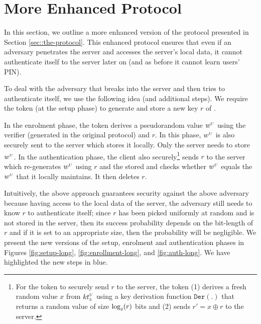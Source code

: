 

\section{More Enhanced Protocol}\label{sec::more-enhanced}



In this section, we outline a more enhanced version of the protocol presented in Section \ref{sec::the-protocol}. This enhanced protocol ensures that even if an adversary penetrates the server and accesses the server's local data, it cannot authenticate itself to the server later on (and as before it cannot learn users' PIN). 

To deal with the adversary that breaks into the server and then tries to authenticate itself, we use the following idea (and additional steps). We require the token (at the setup phase) to generate and store a new key $r$ of \prf.  

In the enrolment phase, the token derives a pseudorandom value $w^{\scriptscriptstyle U}$ using the verifier \VC{\verifier} (generated in the original protocol) and $r$. In this phase, $w^{\scriptscriptstyle U}$ is also securely sent to the server which stores it locally. Only the server needs to store $w^{\scriptscriptstyle U}$. 
%
In the authentication phase, the client also securely\footnote{For the token to securely send $r$ to the server, the token (1) derives a fresh random value $x$ from ${kt}_{\scriptscriptstyle 3}^{\scriptscriptstyle U}$ using a key derivation function $\mathtt{Der}(.)$ that returns a random value of size $\log_{\scriptscriptstyle 2}(r)$ bits and  (2) sends $r'=x\oplus r$ to the server.} sends $r$ to the server which re-generates  $w^{\scriptscriptstyle U}$ using $r$ and the stored \VC{\verifier} and checks whether $w^{\scriptscriptstyle U}$ equals the $w^{\scriptscriptstyle U}$ that it locally maintains. It then deletes $r$. 

Intuitively, the above approach guarantees security against the above adversary because having access to the local data of the server, the adversary still needs to know $r$ to authenticate itself; since $r$ has been picked uniformly at random and is not stored in the server, then its success probability depends on the bit-length of $r$ and if it is set to an appropriate size, then the probability will be negligible. 
%
%
We present the new versions of the setup, enrolment and authentication phases in Figures \ref{fig:setup-long}, \ref{fig:enrollment-long}, and \ref{fig:auth-long}. We have highlighted the new steps in blue. 








